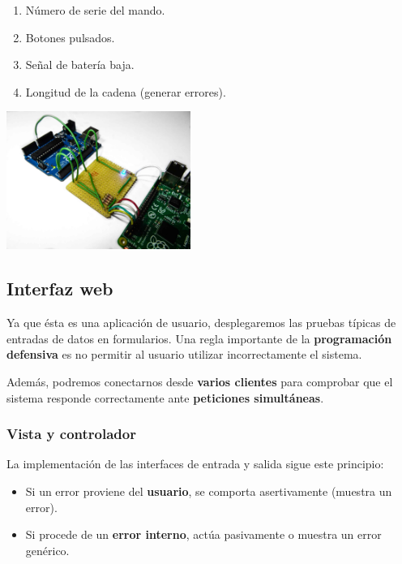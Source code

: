 \documentclass[10pt,a4paper]{article}
\begin{document}
	\begin{multicols}{2}
		\begin{enumerate}[nosep,itemsep=1em]
			\item Número de serie del mando.
			\item Botones pulsados.
			\item Señal de batería baja.
			\item Longitud de la cadena (generar errores).
		\end{enumerate}
		\columnbreak
		\begin{center}
			\includegraphics[width=0.45\textwidth]{images/proto_uart} 
		\end{center}
	\end{multicols}

	\subsection{Interfaz web}
	
	Ya que ésta es una aplicación de usuario, desplegaremos las pruebas típicas de entradas de datos en formularios. Una regla importante de la \textbf{programación defensiva} es no permitir al usuario utilizar incorrectamente el sistema.
	
	Además, podremos conectarnos desde \textbf{varios clientes} para comprobar que el sistema responde correctamente ante \textbf{peticiones simultáneas}.
	
	\subsubsection*{Vista y controlador}
	
	La implementación de las interfaces de entrada y salida sigue este principio:
	
	\begin{itemize}
		\item Si un error proviene del \textbf{usuario}, se comporta asertivamente (muestra un error).
		\item Si procede de un \textbf{error interno}, actúa pasivamente o muestra un error genérico.
	\end{itemize}
	
\end{document}
